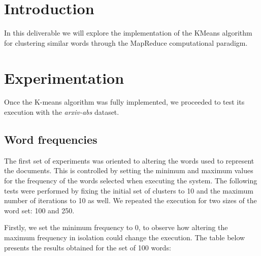 



\section{Introduction}
In this deliverable we will explore the implementation of the KMeans algorithm
for clustering similar words through the MapReduce computational paradigm.

\section{Experimentation}
Once the K-means algorithm was fully implemented, we proceeded to test its execution with the \textit{arxiv-abs} dataset.

\subsection{Word frequencies}
The first set of experiments was oriented to altering the words used to represent the documents. This is controlled by setting the minimum and maximum values for the frequency of the words selected when executing the system. The following tests were performed by fixing the initial set of clusters to 10 and the maximum number of iterations to 10 as well. We repeated the execution for two sizes of the word set: 100 and 250.

Firstly, we set the minimum frequency to 0, to observe how altering the maximum frequency in isolation could change the execution. The table below presents the results obtained for the set of 100 words:

